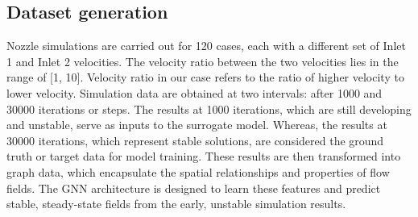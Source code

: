 \subsection{Dataset generation}
Nozzle simulations are carried out for 120 cases, each with a different set of Inlet 1 and Inlet 2 velocities. The velocity ratio between the two velocities lies in the range of [1, 10]. Velocity ratio in our case refers to the ratio of higher velocity to lower velocity.
Simulation data are obtained at two intervals: after 1000 and 30000 iterations or steps. The results at 1000 iterations, which are still developing and unstable, serve as inputs to the surrogate model. Whereas, the results at 30000 iterations, which represent stable solutions, are considered the ground truth or target data for model training. These results are then transformed into graph data, which encapsulate the spatial relationships and properties of flow fields. The GNN architecture is designed to learn these features and predict stable, steady-state fields from the early, unstable simulation results.
